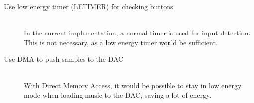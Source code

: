 \begin{description}
  \item[Use low energy timer (LETIMER) for checking buttons.] \hfill \\
        In the current implementation, a normal timer is used for input detection. This is not necessary, as a low energy timer would be sufficient. 
  \item[Use DMA to push samples to the DAC] \hfill \\
        With Direct Memory Access, it would be possible to stay in low energy mode when loading music to the DAC, saving a lot of energy.
\end{description}



